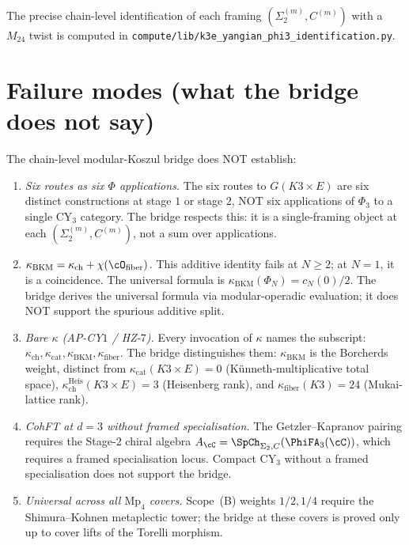 The precise chain-level identification of each framing
$(\Sigma_2^{(m)}, C^{(m)})$ with a $M_{24}$ twist is computed in
\texttt{compute/lib/k3e\_yangian\_phi3\_identification.py}.


\section{Failure modes (what the bridge does not say)}
\label{sec:failure-modes}

The chain-level modular-Koszul bridge does NOT establish:
\begin{enumerate}[label=\textup{(F\arabic*)}]
\item \emph{Six routes as six $\Phi$ applications.} The six routes to
$G(K3 \times E)$ are six distinct constructions at stage $1$ or stage
$2$, NOT six applications of $\Phi_3$ to a single CY$_3$ category.
The bridge respects this: it is a single-framing object at each
$(\Sigma_2^{(m)}, C^{(m)})$, not a sum over applications.
\item \emph{$\kappa_{\mathrm{BKM}} = \kappa_{\mathrm{ch}} + \chi(\cO_{\mathrm{fiber}})$.}
This additive identity fails at $N \geq 2$; at $N = 1$, it is a
coincidence. The universal formula is $\kappa_{\mathrm{BKM}}(\Phi_N) = c_N(0)/2$.
The bridge derives the universal formula via modular-operadic
evaluation; it does NOT support the spurious additive split.
\item \emph{Bare $\kappa$ (AP-CY$1$ / HZ-$7$).} Every invocation of $\kappa$
names the subscript: $\kappa_{\mathrm{ch}}, \kappa_{\mathrm{cat}},
\kappa_{\mathrm{BKM}}, \kappa_{\mathrm{fiber}}$. The bridge distinguishes
them: $\kappa_{\mathrm{BKM}}$ is the Borcherds weight, distinct from
$\kappa_{\mathrm{cat}}(K3 \times E) = 0$ (K\"unneth-multiplicative
total space), $\kappa_{\mathrm{ch}}^{\mathrm{Heis}}(K3 \times E) = 3$
(Heisenberg rank), and $\kappa_{\mathrm{fiber}}(K3) = 24$ (Mukai-lattice
rank).
\item \emph{CohFT at $d = 3$ without framed specialisation.} The
Getzler--Kapranov pairing requires the Stage-$2$ chiral algebra
$A_\cC = \SpCh_{\Sigma_2, C}(\PhiFA_3(\cC))$, which requires a framed
specialisation locus. Compact CY$_3$ without a framed specialisation
does not support the bridge.
\item \emph{Universal across all $\mathrm{Mp}_4$ covers.} Scope~(B)
weights $1/2, 1/4$ require the Shimura--Kohnen metaplectic tower; the
bridge at these covers is proved only up to cover lifts of the Torelli
morphism.
\end{enumerate}

